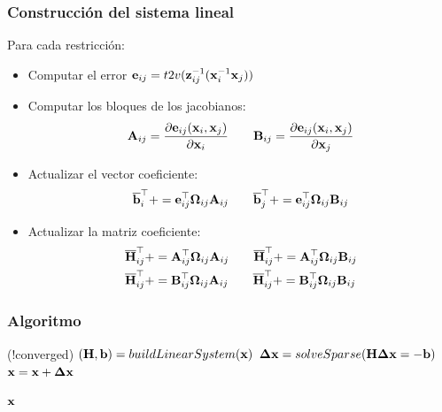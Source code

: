 \begin{frame}
    \frametitle{Construcción del sistema lineal}
    Para cada restricción:
    \begin{itemize}
        \item Computar el error $\boldsymbol{\mathbf{e}}_{ij} = t2v({\boldsymbol{\mathbf{z}}}^{-1}_{ij}({\boldsymbol{\mathbf{x}}}^{-1}_{i}\boldsymbol{\mathbf{x}}_{j}))$
        \item Computar los bloques de los jacobianos:
            \begin{equation*}
                \boldsymbol{\mathbf{A}}_{ij} = \dfrac{\partial\boldsymbol{\mathbf{e}}_{ij}(\boldsymbol{\mathbf{x}}_{i}, \boldsymbol{\mathbf{x}}_{j})}{\partial\boldsymbol{\mathbf{x}}_{i}} \quad \quad \boldsymbol{\mathbf{B}}_{ij} = \dfrac{\partial\boldsymbol{\mathbf{e}}_{ij}(\boldsymbol{\mathbf{x}}_{i}, \boldsymbol{\mathbf{x}}_{j})}{\partial\boldsymbol{\mathbf{x}}_{j}}
            \end{equation*}
    \item Actualizar el vector coeficiente:
        \begin{equation*}
            \overline{\boldsymbol{\mathbf{b}}}_{i}^{\top} += \boldsymbol{\mathbf{e}}_{ij}^{\top}\boldsymbol{\mathbf{\Omega}}_{ij}\boldsymbol{\mathbf{A}}_{ij} \quad \quad \overline{\boldsymbol{\mathbf{b}}}_{j}^{\top} += \boldsymbol{\mathbf{e}}_{ij}^{\top}\boldsymbol{\mathbf{\Omega}}_{ij}\boldsymbol{\mathbf{B}}_{ij}
        \end{equation*}

    \item Actualizar la matriz coeficiente:
        \begin{align*}
            \overline{\boldsymbol{\mathbf{H}}}_{ij}^{\top} &+= \boldsymbol{\mathbf{A}}_{ij}^{\top}\boldsymbol{\mathbf{\Omega}}_{ij}\boldsymbol{\mathbf{A}}_{ij} \quad \quad \overline{\boldsymbol{\mathbf{H}}}_{ij}^{\top} += \boldsymbol{\mathbf{A}}_{ij}^{\top}\boldsymbol{\mathbf{\Omega}}_{ij}\boldsymbol{\mathbf{B}}_{ij} \\
            \overline{\boldsymbol{\mathbf{H}}}_{ij}^{\top} &+= \boldsymbol{\mathbf{B}}_{ij}^{\top}\boldsymbol{\mathbf{\Omega}}_{ij}\boldsymbol{\mathbf{A}}_{ij} \quad \quad \overline{\boldsymbol{\mathbf{H}}}_{ij}^{\top} += \boldsymbol{\mathbf{B}}_{ij}^{\top}\boldsymbol{\mathbf{\Omega}}_{ij}\boldsymbol{\mathbf{B}}_{ij}
        \end{align*}
    \end{itemize}    
    
\end{frame}

\begin{frame}
    \frametitle{Algoritmo}
    
    \begin{algorithmic}[1]
        \While (!converged)
        \State $(\boldsymbol{\mathbf{H}},\boldsymbol{\mathbf{b}}) = buildLinearSystem(\boldsymbol{\mathbf{x}})$
        \State $\boldsymbol{\mathbf{\Delta}}\boldsymbol{\mathbf{x}} = solveSparse(\boldsymbol{\mathbf{H}}\boldsymbol{\mathbf{\Delta}}\boldsymbol{\mathbf{x}} = -\boldsymbol{\mathbf{b}})$
        \State $\boldsymbol{\mathbf{x}} = \boldsymbol{\mathbf{x}} + \boldsymbol{\mathbf{\Delta}}\boldsymbol{\mathbf{x}}$
        \EndWhile

        \State \Return $\boldsymbol{\mathbf{x}}$
        \EndProcedure
    \end{algorithmic}
    
\end{frame}


